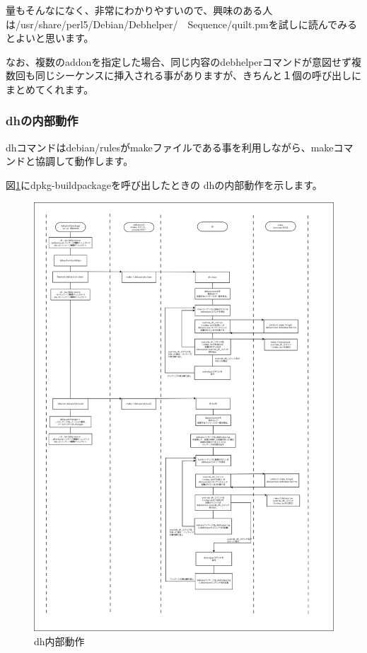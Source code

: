\documentclass[mingoth,a4paper]{jsarticle}
\begin{document}
量もそんなになく、非常にわかりやすいので、興味のある人は/usr/share/perl5/Debian/Debhelper/　Sequence/quilt.pmを試しに読んでみるとよいと思います。

なお、複数のaddonを指定した場合、同じ内容のdebhelperコマンドが意図せず複数回も同じシーケンスに挿入される事がありますが、きちんと１個の呼び出しにまとめてくれます。

\subsubsection{dhの内部動作}

dhコマンドはdebian/rulesがmakeファイルである事を利用しながら、makeコマンドと協調して動作します。

図\ref{fig:dh-internal-schema1}にdpkg-buildpackageを呼び出したときの
dhの内部動作を示します。

\begin{figure}[ht]
  \begin{center}
    \includegraphics[width=17cm]{image201112/dh-internal-schema1.png}
  \end{center}
  \caption{dh内部動作}
  \label{fig:dh-internal-schema1}
\end{figure}
\end{document}
